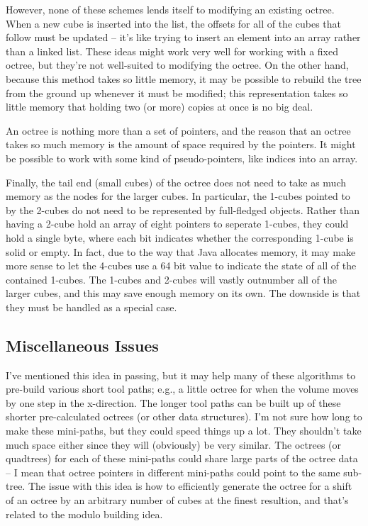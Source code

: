 \documentclass[titlepage,oneside,10pt]{article}
\begin{document}
However, none of these schemes lends itself to modifying an
existing octree. When a new cube is inserted into the list, the
offsets for all of the cubes that follow must be updated -- it's like
trying to insert an element into an array rather than a linked
list. These ideas might work very well for working with a fixed
octree, but they're not well-suited to modifying the octree. On the
other hand, because this method takes so little memory, it may be
possible to rebuild the tree from the ground up whenever it must be
modified; this representation takes so little memory that holding two
(or more) copies at once is no big deal.

An octree is nothing more than a set of pointers, and the reason that
an octree takes so much memory is the amount of space required by the
pointers. It might be possible to work with some kind of
pseudo-pointers, like indices into an array.

Finally, the tail end (small cubes) of the octree does not need to
take as much memory as the nodes for the larger cubes. In particular,
the 1-cubes pointed to by the 2-cubes do not need to be represented by
full-fledged objects. Rather than having a 2-cube hold an array of
eight pointers to seperate 1-cubes, they could hold a single byte,
where each bit indicates whether the corresponding 1-cube is solid or
empty. In fact, due to the way that Java allocates memory, it may make
more sense to let the 4-cubes use a 64 bit value to indicate the state
of all of the contained 1-cubes. The 1-cubes and 2-cubes will vastly
outnumber all of the larger cubes, and this may save enough memory on
its own. The downside is that they must be handled as a special case.

\subsection{Miscellaneous Issues}

I've mentioned this idea in passing, but it may help many of these
algorithms to pre-build various short tool paths; e.g., a little
octree for when the volume moves by one step in the x-direction. The
longer tool paths can be built up of these shorter pre-calculated
octrees (or other data structures). I'm not sure how long to make
these mini-paths, but they could speed things up a lot. They shouldn't
take much space either since they will (obviously) be very
similar. The octrees (or quadtrees) for each of these mini-paths could
share large parts of the octree data -- I mean that octree pointers in
different mini-paths could point to the same sub-tree. The issue with this idea
is how to efficiently generate the octree for a shift of an octree by
an arbitrary number of cubes at the finest resultion, and that's
related to the modulo building idea.
\end{document}
